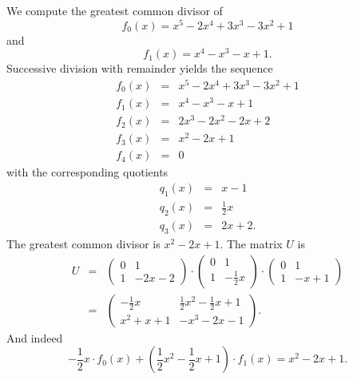 \begin{example}
  \label{exe:1}
  We compute the greatest common divisor of
  \begin{displaymath}
     f_0(x)= x^5 - 2x^4 + 3x^3 - 3x^2 + 1
  \end{displaymath}
  and
  \begin{displaymath}
    f_1(x) = x^4 - x^3 - x + 1.
  \end{displaymath}
    Successive division with remainder yields the sequence 
  \begin{eqnarray*}
    f_0(x) &= &  x^5 - 2x^4 + 3x^3 - 3x^2 + 1 \\
    f_1(x) &=&  x^4 - x^3 - x + 1 \\
    f_2(x) & = & 2x^3 - 2x^2 - 2x + 2 \\
    f_3(x) & = &  x^2 - 2x + 1 \\
    f_4(x) & = & 0
  \end{eqnarray*}
  with the corresponding quotients    
  \begin{eqnarray*}
    \label{eq:9}
    q_1(x) & = &  x - 1 \\
    q_2(x) & = &  \frac{1}{2}x \\
    q_3(x) & = &   2x + 2.     
  \end{eqnarray*}
The greatest common  divisor is $x^2 - 2x + 1$. The matrix $U$ is 
  \begin{eqnarray*}
    U & = &  \left(\begin{array}{rr}
0 & 1 \\
1 & -2 x - 2
\end{array}\right) ⋅
\left(\begin{array}{rr}
0 & 1 \\
1 & -\frac{1}{2} x
\end{array}\right) ⋅ 
\left(\begin{array}{rr}
0 & 1 \\
1 & -x + 1
      \end{array}\right) \\
    & = & \left(\begin{array}{rr}
-\frac{1}{2} x & \frac{1}{2} x^{2} - \frac{1}{2} x + 1 \\
x^{2} + x + 1 & -x^{3} - 2 x - 1
\end{array}\right).
  \end{eqnarray*}
  And indeed
  \begin{displaymath}
    -\frac{1}{2} x  ⋅ f_0(x) +  \left(\frac{1}{2} x^{2} - \frac{1}{2} x + 1\right) ⋅ f_1(x) = x^2 - 2x + 1. 
  \end{displaymath}
\end{example}


